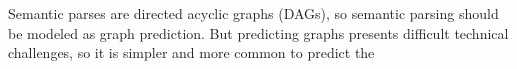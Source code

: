 Semantic parses are directed acyclic graphs (DAGs), so semantic parsing should be modeled as graph prediction. But predicting graphs presents difficult technical challenges, so it is simpler and more common to predict the